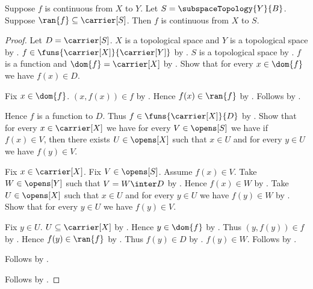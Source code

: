 \begin{theorem}\label{continuous_codomain_corestriction}
    Suppose $f$ is continuous from $X$ to $Y$.
    Let $S=\subspaceTopology{Y}{B}$.
    Suppose $\ran{f}\subseteq\carrier[S]$.
    Then $f$ is continuous from $X$ to $S$.
\end{theorem}
\begin{proof}
    Let $D=\carrier[S]$.
    $X$ is a topological space and $Y$ is a topological space
        by .
    $f\in\funs{\carrier[X]}{\carrier[Y]}$
        by .
    $S$ is a topological space
        by .
    $f$ is a function and $\dom{f}=\carrier[X]$
        by .
    Show that for every $x\in\dom{f}$ we have $f(x)\in D$.
    \begin{subproof}
        Fix $x\in\dom{f}$.
        $(x,f(x))\in f$ by .
        Hence $f(x)\in\ran{f}$ by .
        Follows by .
    \end{subproof}
    Hence $f$ is a function to $D$.
    Thus $f\in\funs{\carrier[X]}{D}$ by .
    Show that for every $x\in\carrier[X]$ we have
        for every $V\in\opens[S]$ we have if $f(x)\in V$, then
        there exists $U\in\opens[X]$ such that $x\in U$ and
            for every $y\in U$ we have $f(y)\in V$.
    \begin{subproof}
        Fix $x\in\carrier[X]$.
        Fix $V\in\opens[S]$.
        Assume $f(x)\in V$.
        Take $W\in\opens[Y]$ such that $V=W\inter D$
            by .
        Hence $f(x)\in W$ by .
        Take $U\in\opens[X]$ such that $x\in U$ and
            for every $y\in U$ we have $f(y)\in W$
            by .
        Show that for every $y\in U$ we have $f(y)\in V$.
        \begin{subproof}
            Fix $y\in U$.
            $U\subseteq\carrier[X]$ by .
            Hence $y\in\dom{f}$ by .
            Thus $(y,f(y))\in f$ by .
            Hence $f(y)\in\ran{f}$ by .
            Thus $f(y)\in D$ by .
            $f(y)\in W$.
            Follows by .
        \end{subproof}
        Follows by \auto.
    \end{subproof}
    Follows by .
\end{proof}

